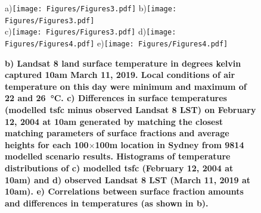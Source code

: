 \documentclass[final,3p,times,authoryear]{elsarticle}
\begin{document}
\begin{figure} 
\centering
a)\texttt{[image: Figures/Figures3.pdf]}
b)\texttt{[image: Figures/Figures3.pdf]}\\
c)\texttt{[image: Figures/Figures3.pdf]}
d)\texttt{[image: Figures/Figures4.pdf]}
e)\texttt{[image: Figures/Figures4.pdf]}
\caption{\bf b) Landsat 8 land surface temperature in degrees kelvin captured 10am March 11, 2019. Local conditions of air temperature on this day were minimum and maximum of 22 and 26\SI{}{\degreeCelsius}. c) Differences in surface temperatures (modelled \gls{tsfc} minus observed Landsat 8 LST) on February 12, 2004 at 10am generated by matching the closest matching parameters of surface fractions and average heights for each 100$\times$100m location in Sydney from 9814 modelled scenario results. Histograms of temperature distributions of c) modelled \gls{tsfc} (February 12, 2004 at 10am) and d) observed Landsat 8 LST (March 11, 2019 at 10am). e) Correlations between surface fraction amounts and differences in temperatures (as shown in b). }
 \label{fig:Sydney-Landsat-LST-11-03-2019}
 \label{fig:Sydney_TSFC12_85}
\end{figure}
\end{document}

